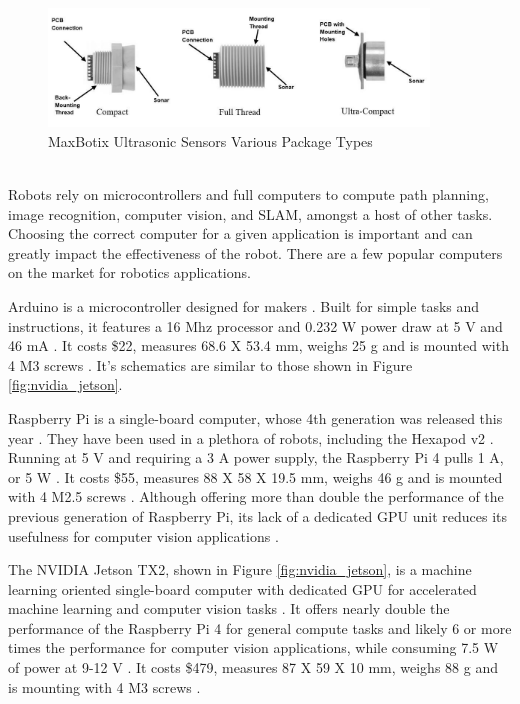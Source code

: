 \begin{figure}[H]
    \centering
    \includegraphics[width=0.9\textwidth]{Sections/LiteratureReview/img/electronics/elec_sonic.JPG}
    \caption{MaxBotix Ultrasonic Sensors Various Package Types \cite{maxbotix_mb7052_nodate} }
    \label{fig:elec_sonic}
\end{figure}

\mbox{}\\

Robots rely on microcontrollers and full computers to compute path planning, image recognition, computer vision, and SLAM, amongst a host of other tasks.
Choosing the correct computer for a given application is important and can greatly impact the effectiveness of the robot.
There are a few popular computers on the market for robotics applications.

Arduino is a microcontroller designed for makers \cite{arduino_arduino_nodate}.
Built for simple tasks and instructions, it features a 16 Mhz processor and 0.232 W power draw at 5 V and 46 mA \cite{gadget_makers_blog_arduino_2013}.
It costs \$22, measures 68.6 X 53.4 mm, weighs 25 g and is mounted with 4 M3 screws \cite{elprocus_arduino_2019}. It's schematics are similar to those shown in Figure \ref{fig:nvidia_jetson}.

Raspberry Pi is a single-board computer, whose 4th generation was released this year \cite{raspberry_pi_raspberry_nodate}.
They have been used in a plethora of robots, including the Hexapod v2 \cite{smallp_tsai_hexapod_2018}.
Running at 5 V and requiring a 3 A power supply, the Raspberry Pi 4 pulls 1 A, or 5 W \cite{raspi.tv_how_2019}.
It costs \$55, measures 88 X 58 X 19.5 mm, weighs 46 g and is mounted with 4 M2.5 screws \cite{piltch_raspberry_2019} \cite{raspberry_pi_raspberry_nodate}.
Although offering more than double the performance of the previous generation of Raspberry Pi, its lack of a dedicated GPU unit reduces its usefulness for computer vision applications \cite{pulli_realtime_2012}.

The NVIDIA Jetson TX2, shown in Figure \ref{fig:nvidia_jetson}, is a machine learning oriented single-board computer with dedicated GPU for accelerated machine learning and computer vision tasks \cite{nvidia_jetson_2017}.
It offers nearly double the performance of the Raspberry Pi 4 for general compute tasks and likely 6 or more times the performance for computer vision applications, while consuming 7.5 W of power at 9-12 V \cite{pulli_realtime_2012} \cite{larabel_initial_nodate} \cite{larabel_benchmarks_2017} \cite{nvidia_jetson_2017-1}.
It costs \$479, measures 87 X 59 X 10 mm, weighs 88 g and is mounting with 4 M3 screws \cite{nvidia_jetson_2018}.

